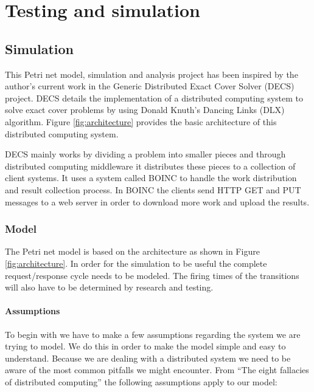 
\chapter{Testing and simulation}
\label{testing}



\section{Simulation}

This Petri net model, simulation and analysis project has been inspired by the author's current work in the Generic Distributed Exact Cover Solver (DECS) \cite{decs-web} project.
DECS details the implementation of a distributed computing system to solve exact cover problems by using Donald Knuth's Dancing Links (DLX) \cite{knuth00dancing} algorithm.
Figure \ref{fig:architecture} provides the basic architecture of this distributed computing system.

DECS mainly works by dividing a problem into smaller pieces and through distributed computing middleware it distributes these pieces to a collection of client systems.
It uses a system called BOINC \cite{boinc} to handle the work distribution and result collection process.
In BOINC the clients send HTTP GET and PUT messages to a web server in order to download more work and upload the results.


\subsection{Model}

The Petri net model is based on the architecture as shown in Figure \ref{fig:architecture}.
In order for the simulation to be useful the complete request/response cycle needs to be modeled.
The firing times of the transitions will also have to be determined by research and testing.


\subsubsection{Assumptions}

To begin with we have to make a few assumptions regarding the system we are trying to model.
We do this in order to make the model simple and easy to understand.
Because we are dealing with a distributed system we need to be aware of the most common pitfalls we might encounter.
From ``The eight fallacies of distributed computing'' \cite{distributed-fallacies} the following assumptions apply to our model:

